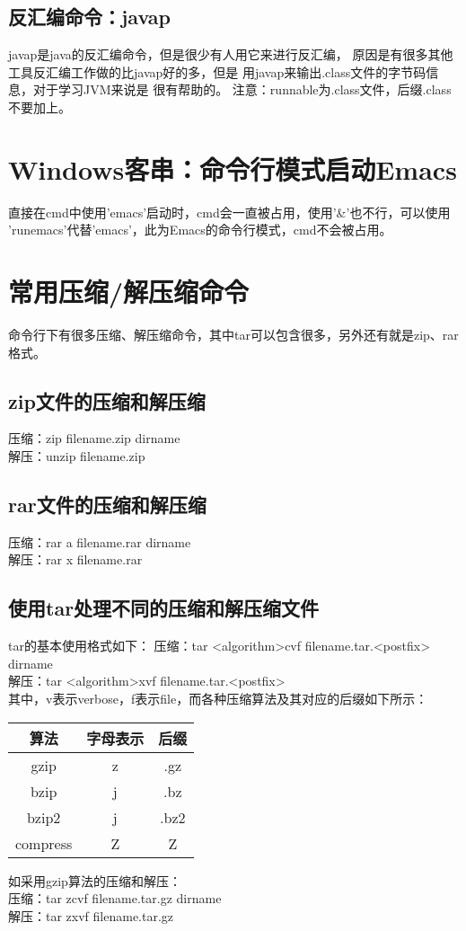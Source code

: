 ﻿\documentclass[a4paper,11pt]{article}
\begin{document}
  \subsection[反汇编命令：javap]{反汇编命令：javap}
  javap是java的反汇编命令，但是很少有人用它来进行反汇编，
  原因是有很多其他工具反汇编工作做的比javap好的多，但是
  用javap来输出.class文件的字节码信息，对于学习JVM来说是
  很有帮助的。
  注意：runnable为.class文件，后缀.class不要加上。

  \section[Windows客串：命令行模式启动Emacs]{Windows客串：命令行模式启动Emacs}
  直接在cmd中使用'emacs'启动时，cmd会一直被占用，使用'\&'也不行，可以使用
  'runemacs'代替'emacs'，此为Emacs的命令行模式，cmd不会被占用。

  \section[常用压缩/解压缩命令]{常用压缩/解压缩命令}
  命令行下有很多压缩、解压缩命令，其中tar可以包含很多，另外还有就是zip、rar格式。
  \subsection[zip文件的压缩和解压缩]{zip文件的压缩和解压缩}
  压缩：zip filename.zip dirname\\
  解压：unzip filename.zip
  \subsection[rar文件的压缩和解压缩]{rar文件的压缩和解压缩}
  压缩：rar a filename.rar dirname\\
  解压：rar x filename.rar
  \subsection[使用tar处理不同的压缩和解压缩文件]{使用tar处理不同的压缩和解压缩文件}
  tar的基本使用格式如下：
  压缩：tar <algorithm>cvf filename.tar.<postfix> dirname\\
  解压：tar <algorithm>xvf filename.tar.<postfix>\\
  其中，v表示verbose，f表示file，而各种压缩算法及其对应的后缀如下所示：\par
  \begin{center}
  \begin{tabular}{ccc}
    \hline
    算法 & 字母表示 & 后缀\\ \hline
    gzip & z & .gz\\
    bzip & j & .bz\\
    bzip2 & j & .bz2\\
    compress & Z & Z\\ \hline
  \end{tabular}
  \end{center}
  如采用gzip算法的压缩和解压：\\
  压缩：tar zcvf filename.tar.gz dirname\\
  解压：tar zxvf filename.tar.gz
\end{document}
